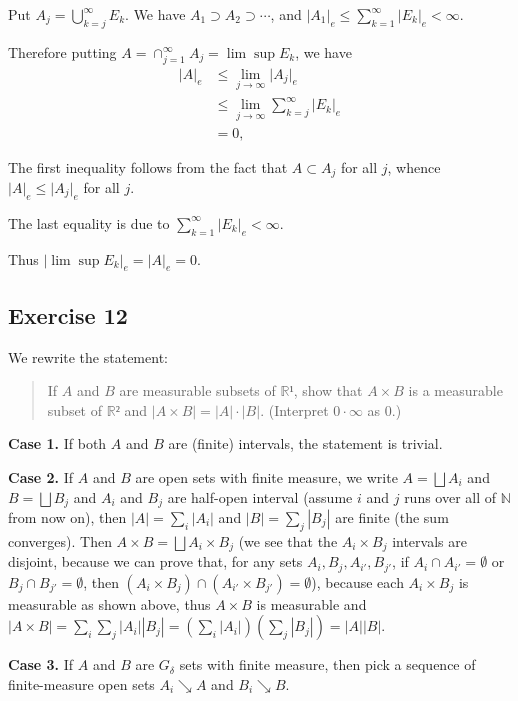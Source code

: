 \documentclass{article}
\begin{document}
Put $A_{j} = \bigcup_{k = j}^{\infty} E_{k}$. We have $A_{1} \supset A_{2} \supset \cdots$, and $\lvert A_{1} \rvert_{e} \leq \sum_{k=1}^{\infty} \lvert E_{k} \rvert_{e} < \infty$. 

Therefore putting $A = \cap_{j=1}^{\infty} A_{j} = \lim \sup E_{k}$, we have 
\begin{align*}
\lvert A \rvert_{e} &\leq \lim_{j \rightarrow \infty} \lvert A_{j} \rvert_{e} \\
	&\leq \lim_{j \rightarrow \infty} \sum_{k=j}^{\infty} \lvert E_{k} \rvert_{e} \\
	&= 0,
\end{align*}

The first inequality follows from the fact that $A \subset A_{j}$ for all $j$, whence $\lvert A \rvert_{e} \leq \lvert A_{j} \rvert_{e}$ for all $j$.

The last equality is due to $\sum_{k=1}^{\infty} \lvert E_{k} \rvert_{e} < \infty$.

Thus $\lvert \lim \sup E_{k} \rvert_{e} = \lvert A \rvert_{e} = 0$.

\subsection{Exercise 12}%

We rewrite the statement:
\begin{quote}
    If $A$ and $B$ are measurable subsets of $ℝ¹$, show that $A × B$ is a measurable subset of $ℝ²$ and $|A × B|=|A|⋅|B|$. (Interpret $0 ⋅ ∞$ as $0$.)
\end{quote}

\textbf{Case 1.}
If both $A$ and $B$ are (finite) intervals, the statement is trivial.

\textbf{Case 2.}
If $A$ and $B$ are open sets with finite measure, we write $A=⨆ A_i$ and $B=⨆ B_j$ and $A_i$ and $B_j$ are half-open interval (assume $i$ and $j$ runs over all of $ℕ$ from now on), then $|A|=∑_i |A_i|$ and $|B|=∑_j |B_j|$ are finite (the sum converges). Then $A × B = ⨆ A_i × B_j$ (we see that the $A_i × B_j$ intervals are disjoint, because we can prove that, for any sets $A_i, B_j, A_{i'}, B_{j'}$, if $A_i ∩ A_{i'}=∅$ or $B_j ∩ B_{j'}=∅$, then $(A_i × B_j)∩(A_{i'}× B_{j'})=∅$), because each $A_i × B_j$ is measurable as shown above, thus $A × B$ is measurable and $|A × B|=∑_i ∑_j |A_i| |B_j| = (∑_i |A_i|) (∑_j |B_j|) = |A| |B|$.

\textbf{Case 3.}
If $A$ and $B$ are $G_δ$ sets with finite measure, then pick a sequence of finite-measure open sets $A_i ↘ A$ and $B_i ↘ B$.
\end{document}
